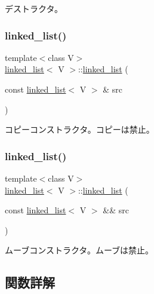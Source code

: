 デストラクタ。 \hypertarget{classlinked__list_aaf6d89a06323148a3bfa85f98e73ec34}{}\label{classlinked__list_aaf6d89a06323148a3bfa85f98e73ec34} 
\subsubsection{\texorpdfstring{linked\+\_\+list()}{linked\_list()}\hspace{0.1cm}{\footnotesize\ttfamily [2/3]}}
{\footnotesize\ttfamily template$<$class V$>$ \\
\hyperlink{classlinked__list}{linked\+\_\+list}$<$ V $>$\+::\hyperlink{classlinked__list}{linked\+\_\+list} (\begin{DoxyParamCaption}\item[{const \hyperlink{classlinked__list}{linked\+\_\+list}$<$ V $>$ \&}]{src }\end{DoxyParamCaption})\hspace{0.3cm}{\ttfamily [delete]}}

コピーコンストラクタ。コピーは禁止。 \hypertarget{classlinked__list_a627932cc8618cd1bae44935116702d29}{}\label{classlinked__list_a627932cc8618cd1bae44935116702d29} 
\subsubsection{\texorpdfstring{linked\+\_\+list()}{linked\_list()}\hspace{0.1cm}{\footnotesize\ttfamily [3/3]}}
{\footnotesize\ttfamily template$<$class V$>$ \\
\hyperlink{classlinked__list}{linked\+\_\+list}$<$ V $>$\+::\hyperlink{classlinked__list}{linked\+\_\+list} (\begin{DoxyParamCaption}\item[{const \hyperlink{classlinked__list}{linked\+\_\+list}$<$ V $>$ \&\&}]{src }\end{DoxyParamCaption})\hspace{0.3cm}{\ttfamily [delete]}}

ムーブコンストラクタ。ムーブは禁止。 

\subsection{関数詳解}
\hypertarget{classlinked__list_aed6c01e534aab66ece6429d836f39f8f}{}\label{classlinked__list_aed6c01e534aab66ece6429d836f39f8f} 

